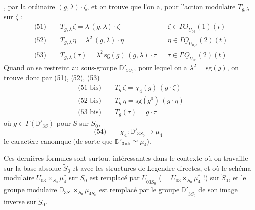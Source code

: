 \documentclass[11pt,a4paper]{article}
\begin{document}
, par la  ordinaire
$(g, \lambda) \cdot \zeta$, et on trouve que l'on a, pour l'action
modulaire $T_{g,\lambda}$ sur $\zeta$ :
\[
  \begin{aligned}
    &\text{(51)} \qquad T_{g,\lambda}\, \zeta = \lambda\, (g,\lambda) \cdot \zeta
      && \zeta \in \Gamma\underline{O}_{U_{03}}(1)(t) \\
    &\text{(52)} \qquad T_{g,\lambda}\, \eta = \lambda^2\, (g,\lambda) \cdot \eta
      && \eta \in \Gamma\underline{O}_{U_{0,3}}(2)(t) \\
    &\text{(53)} \qquad T_{g,\lambda}(\tau) = \lambda^2\, \mathrm{sg}(g)\, (g,\lambda) \cdot \tau
      && \tau \in \Gamma\,\underline{O}_{U_{03}}(2)(t)
  \end{aligned}
\]
Quand on se restreint au sous-groupe $\mathbb{D}'_{3S_0}$, pour lequel on a
$\lambda^2 = \mathrm{sg}(g)$, on trouve donc par (51), (52), (53)
\[
  \begin{aligned}
    &\text{(51 bis)} \qquad T_g\, \zeta = \chi_4(g)\, (g \cdot \zeta) \\
    &\text{(52 bis)} \qquad T_g\, \eta = \mathrm{sg}(g^{0})\, (g \cdot \eta) \\
    &\text{(53 bis)} \qquad T_g(\tau) = g \cdot \tau
  \end{aligned}
\]
où $g \in \Gamma(\mathbb{D}'_{3S})$ pour $S$ sur $S_0$,
\[
  \text{(54)} \qquad \chi_4 : \mathbb{D}'_{3S_0} \to \mu_4
\]
le caractère canonique (de sorte que
$\mathbb{D}'_{3\,\mathrm{ab}} \simeq \mu_4$).

Ces dernières formules sont surtout intéressantes dans le contexte où on
travaille \struck{\ill{}} sur  la base absolue $\widetilde{S}_0$ et
avec les structures de Legendre directes, et où le schéma modulaire
$U_{03} \times_{S_0} \mu_4^{*}$ sur $S_0$ est remplacé par
$U_{03\widetilde{S}_0}$ ($= U_{03} \times_{S_0} \mu_4^{*}$ !) sur
$\widetilde{S}_0$, et le groupe modulaire
$\mathbb{D}_{3S_0} \times_{S_0} \mu_{4S_0}$ est remplacé par le
groupe $\mathbb{D}'_{3\widetilde{S}_0}$ de
\struck{\ill{}} son image inverse sur $\widetilde{S}_0$.
\end{document}
